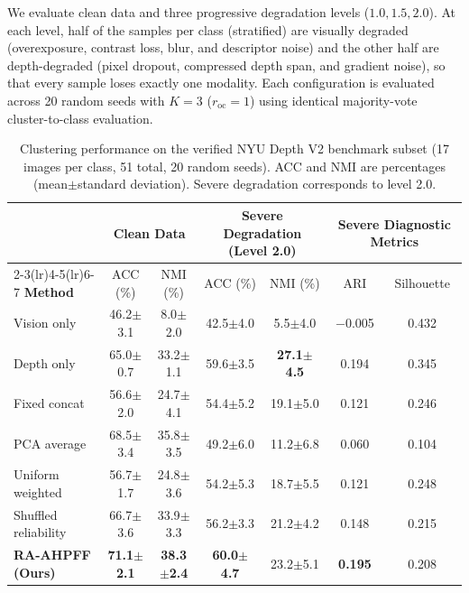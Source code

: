 \documentclass[11pt, a4paper]{article}
\begin{document}
We evaluate clean data and three progressive degradation levels ($1.0, 1.5, 2.0$). At each level, half of the samples per class (stratified) are visually degraded (overexposure, contrast loss, blur, and descriptor noise) and the other half are depth-degraded (pixel dropout, compressed depth span, and gradient noise), so that every sample loses exactly one modality. Each configuration is evaluated across 20 random seeds with $K=3$ ($r_{\text{oc}}=1$) using identical majority-vote cluster-to-class evaluation.

\begin{table}[htbp]
    \centering
    \caption{Clustering performance on the verified NYU Depth V2 benchmark subset (17 images per class, 51 total, 20 random seeds). ACC and NMI are percentages (mean$\pm$standard deviation). Severe degradation corresponds to level 2.0.}
    \label{tab:nyu_ablation}
    \footnotesize
    \setlength{\tabcolsep}{4.5pt}
    \begin{tabular}{lcccccc}
        \toprule
        & \multicolumn{2}{c}{\textbf{Clean Data}} & \multicolumn{2}{c}{\textbf{Severe Degradation (Level 2.0)}} & \multicolumn{2}{c}{\textbf{Severe Diagnostic Metrics}} \\
        \cmidrule(lr){2-3}\cmidrule(lr){4-5}\cmidrule(lr){6-7}
        \textbf{Method} & ACC (\%) & NMI (\%) & ACC (\%) & NMI (\%) & ARI & Silhouette \\
        \midrule
        Vision only & 46.2$\pm$3.1 & 8.0$\pm$2.0 & 42.5$\pm$4.0 & 5.5$\pm$4.0 & $-$0.005 & 0.432 \\
        Depth only & 65.0$\pm$0.7 & 33.2$\pm$1.1 & 59.6$\pm$3.5 & \textbf{27.1$\pm$4.5} & 0.194 & 0.345 \\
        Fixed concat & 56.6$\pm$2.0 & 24.7$\pm$4.1 & 54.4$\pm$5.2 & 19.1$\pm$5.0 & 0.121 & 0.246 \\
        PCA average & 68.5$\pm$3.4 & 35.8$\pm$3.5 & 49.2$\pm$6.0 & 11.2$\pm$6.8 & 0.060 & 0.104 \\
        Uniform weighted & 56.7$\pm$1.7 & 24.8$\pm$3.6 & 54.2$\pm$5.3 & 18.7$\pm$5.5 & 0.121 & 0.248 \\
        Shuffled reliability & 66.7$\pm$3.6 & 33.9$\pm$3.3 & 56.2$\pm$3.3 & 21.2$\pm$4.2 & 0.148 & 0.215 \\
        \textbf{RA-AHPFF (Ours)} & \textbf{71.1$\pm$2.1} & \textbf{38.3$\pm$2.4} & \textbf{60.0$\pm$4.7} & 23.2$\pm$5.1 & \textbf{0.195} & 0.208 \\
        \bottomrule
    \end{tabular}
\end{table}
\end{document}
